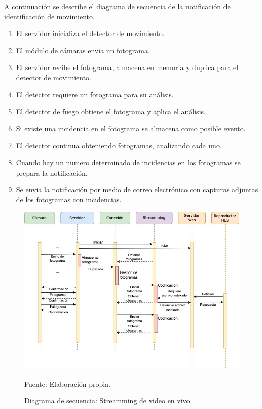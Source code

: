A continuación se describe el diagrama de secuencia de la notificación de identificación de movimiento.\\
\begin{enumerate}
    \item El servidor inicializa el detector de movimiento.
    \item El módulo de cámaras envia un fotograma.    
    \item El servidor recibe el fotograma, almacena en memoria y duplica para el detector de movimiento.
    \item El detector requiere un fotograma para su análisis.
    \item El detector de fuego obtiene el fotograma y aplica el análisis.
    \item Si existe una incidencia en el fotograma se almacena como posible evento. 
    \item El detector continua obteniendo fotogramas, analizando cada uno.
    \item Cuando hay un numero determinado de incidencias en los fotogramas se prepara la notificación.
    \item Se envia la notificación por medio de correo electrónico con capturas adjuntas de los fotogramas con incidencias.
\end{enumerate}


\begin{figure}[H]
    \begin{center}
        \includegraphics[width=18cm]{img/capitulo_4/stream_secuense.jpg}
    \end{center}
    \begin{center}
        \caption{Diagrama de secuencia: Streamming de video en vivo.}
        Fuente: Elaboración propia.
        \label{fig:diag_sec_streamming}
    \end{center}
\end{figure}

